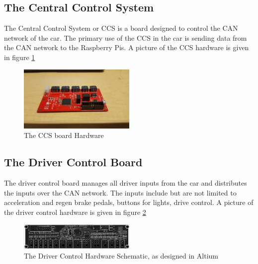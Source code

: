 \documentclass{article}
\begin{document}
    \subsection{The Central Control System}
    The Central Control System or CCS is a board designed to control the
    CAN network of the car. The primary use of the CCS in the car is 
    sending data from the CAN network to the Raspberry Pis. A picture of
    the CCS hardware is given in figure \ref{fig:css}
    \begin{figure}[H]
        \centering
        \includegraphics[width=0.5\textwidth]{images/ccs.jpg}
        \caption{The CCS board Hardware}
        \label{fig:css}
    \end{figure}
    \subsection{The Driver Control Board}
    The driver control board manages all driver inputs from the car and
    distributes the inputs over the CAN network. The inputs include but
    are not limited to acceleration and regen brake pedals, buttons for
    lights, drive control. A picture of the driver control hardware is
    given in figure \ref{fig:driver}
    \begin{figure}[H]
        \centering
        \includegraphics[width=0.5\textwidth]{images/driver.png}
        \caption{The Driver Control Hardware Schematic, as designed in
                 Altium}
        \label{fig:driver}
    \end{figure}
\end{document}
